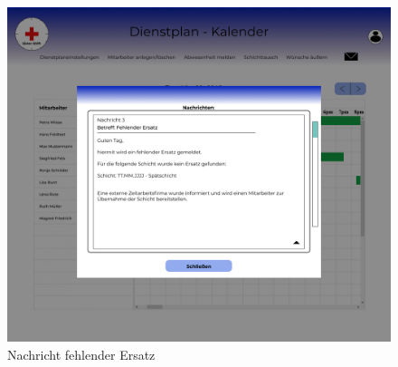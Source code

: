 \documentclass[11pt,
paper=a4,
bibtotocnumbered,	  %
liststotocnumbered,  %
DIV=calc,		  %
tablecaptionabove,	  %
headinclude,
]{article}
\begin{document}
\begin{figure}[H]
\includegraphics[width=1\textwidth]{Bilder/Screens/NachrichtStatleitungFehlenderErsatz.jpg}{\centering}
\caption{Nachricht fehlender Ersatz}
\end{figure}
\end{document}
